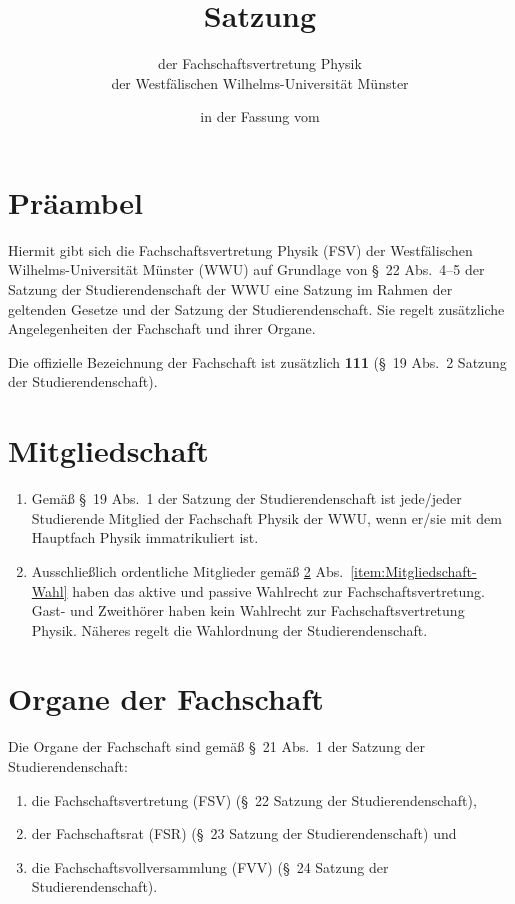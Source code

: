\documentclass[
a4paper,
12pt,
oneside,
parskip=half-,
pagesize,
headsepline,
german,
ngerman
]{scrartcl}
\title{Satzung}
\subtitle{der Fachschaftsvertretung Physik\\
	der Westfälischen Wilhelms-Universität Münster}
\date{in der Fassung vom \formatdate{17}{12}{2014}}
\author{}
\begin{document}
	
	\maketitle
	
	\section{Präambel}
	Hiermit gibt sich die Fachschaftsvertretung Physik (FSV) der Westfälischen Wilhelms-Universi\-tät Münster (WWU) auf Grundlage von §~22 Abs.~4--5 der Satzung der Studierendenschaft der WWU eine Satzung im Rahmen der geltenden Gesetze und der Satzung der Studierendenschaft. Sie regelt zusätzliche Angelegenheiten der Fachschaft und ihrer Organe.
	
	Die offizielle Bezeichnung der Fachschaft ist zusätzlich \textbf{111} (§~19 Abs.~2 Satzung der Studierendenschaft).
	
	\section{Mitgliedschaft}
	\label{sec:Mitgliedschaft}
	\begin{enumerate}
		\item Gemäß §~19 Abs.~1 der Satzung der Studierendenschaft ist jede/jeder Studierende Mitglied der Fachschaft Physik der WWU, wenn er/sie mit dem Hauptfach Physik immatrikuliert ist. \label{item:Mitgliedschaft-Wahl}
		\item Ausschließlich ordentliche Mitglieder gemäß \ref{sec:Mitgliedschaft} Abs.~\ref{item:Mitgliedschaft-Wahl} haben das aktive und passive Wahlrecht zur Fachschaftsvertretung. Gast- und Zweithörer haben kein Wahlrecht zur Fachschaftsvertretung Physik. Näheres regelt die Wahlordnung der Studierendenschaft.
	\end{enumerate}
	
	\section{Organe der Fachschaft}
	Die Organe der Fachschaft sind gemäß §~21 Abs.~1 der Satzung der Studierendenschaft:
	\begin{enumerate}
		\item die Fachschaftsvertretung (FSV) (§~22 Satzung der Studierendenschaft),
		\item der Fachschaftsrat (FSR) (§~23 Satzung der Studierendenschaft) und 
		\item die Fachschaftsvollversammlung (FVV) (§~24 Satzung der Studierendenschaft).
	\end{enumerate}
	
\end{document}
